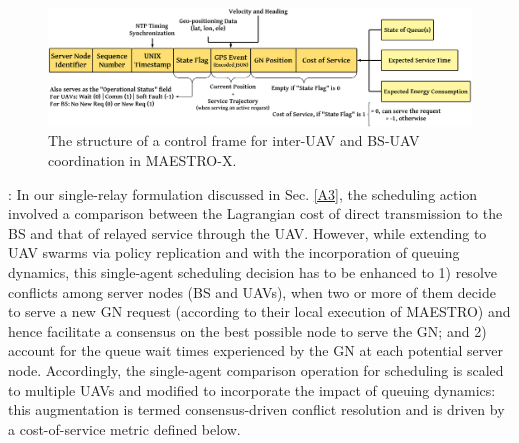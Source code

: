 \documentclass[12pt, draftcls, onecolumn]{IEEEtran}
\theoremstyle{plain}
\theoremstyle{definition}
\theoremstyle{remark}
\begin{document}
\begin{figure} [t]
    \centering
    \includegraphics[width=0.9\linewidth]{figs/Control_Frame_Design.png}
    \vspace{-2mm}
    \caption{The structure of a control frame for inter-UAV and BS-UAV coordination in MAESTRO-X.}
    \label{F5.5}
\end{figure}

: 
In our single-relay formulation discussed in Sec. \ref{A3}, the scheduling action involved a comparison between the Lagrangian cost of direct transmission to the BS and that of relayed service through the UAV. However, while extending to UAV swarms via policy replication and with the incorporation of queuing dynamics, this single-agent scheduling decision has to be enhanced to 1) resolve conflicts among server nodes (BS and UAVs), when two or more of them decide to serve a new GN request (according to their local execution of MAESTRO) and hence facilitate a consensus on the best possible node to serve the GN; and 2) account for the queue wait times experienced by the GN at each potential server node. Accordingly, the single-agent comparison operation for scheduling is scaled to multiple UAVs and modified to incorporate the impact of queuing dynamics: this augmentation is termed consensus-driven conflict resolution and is driven by a cost-of-service metric defined below. 
\end{document}
